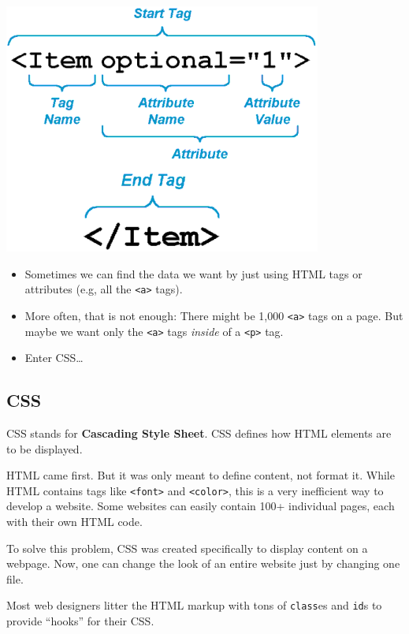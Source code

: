 \documentclass[
]{book}
\providecommand{\tightlist}{%
  \setlength{\itemsep}{0pt}\setlength{\parskip}{0pt}}
\begin{document}
\begin{center}\includegraphics[width=0.7\linewidth]{img/html-attributes} \end{center}

\begin{itemize}
\tightlist
\item
  Sometimes we can find the data we want by just using HTML tags or attributes (e.g, all the \texttt{\textless{}a\textgreater{}} tags).
\item
  More often, that is not enough: There might be 1,000 \texttt{\textless{}a\textgreater{}} tags on a page. But maybe we want only the \texttt{\textless{}a\textgreater{}} tags \emph{inside} of a \texttt{\textless{}p\textgreater{}} tag.
\item
  Enter CSS\ldots{}
\end{itemize}

\hypertarget{css}{%
\subsection{CSS}\label{css}}

CSS stands for \textbf{Cascading Style Sheet}. CSS defines how HTML elements are to be displayed.

HTML came first. But it was only meant to define content, not format it. While HTML contains tags like \texttt{\textless{}font\textgreater{}} and \texttt{\textless{}color\textgreater{}}, this is a very inefficient way to develop a website. Some websites can easily contain 100+ individual pages, each with their own HTML code.

To solve this problem, CSS was created specifically to display content on a webpage. Now, one can change the look of an entire website just by changing one file.

Most web designers litter the HTML markup with tons of \texttt{class}es and \texttt{id}s to provide ``hooks'' for their CSS.
\end{document}
